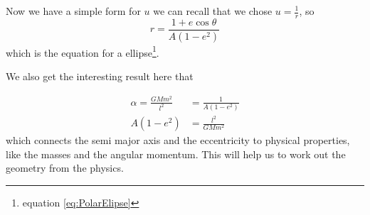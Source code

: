 Now we have a simple form for $u$ we can recall that we chose $u=\frac{1}{r}$, so
\begin{equation}
r=\frac{1+e\cos\theta}{A(1-e^2)}
\end{equation}
which is the equation for a ellipse\footnote{equation \ref{eq:PolarElipse}}.

We also get the interesting result here that

\begin{align}
\alpha = \frac{GMm^2}{l^2}&=\frac{1}{A(1-e^2)} \nonumber \\
A(1-e^2)&=\frac{l^2}{GMm^2} \label{eq:link}
\end{align}
which connects the semi major axis and the eccentricity to physical properties, like the masses and the angular momentum. This will help us to work out the geometry from the physics.
